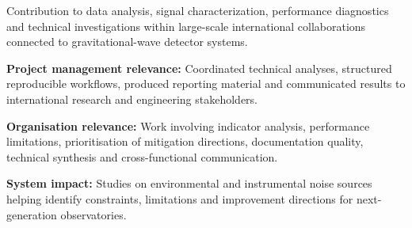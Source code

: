 \documentclass[8pt,a4paper,ragged2e,withhyper]{altacv}
\begin{document}
Contribution to data analysis, signal characterization, performance diagnostics and technical investigations within large-scale international collaborations connected to gravitational-wave detector systems.

\textbf{Project management relevance:} Coordinated technical analyses, structured reproducible workflows, produced reporting material and communicated results to international research and engineering stakeholders.

\textbf{Organisation relevance:} Work involving indicator analysis, performance limitations, prioritisation of mitigation directions, documentation quality, technical synthesis and cross-functional communication.

\textbf{System impact:} Studies on environmental and instrumental noise sources helping identify constraints, limitations and improvement directions for next-generation observatories.


\vspace{-.3cm}


{\small
{}
}

\divider\smallskip
\vspace{-.3cm}


{\small
{}
}

\divider\smallskip
\vspace{-.3cm}


{\small
{}
}
\end{document}
